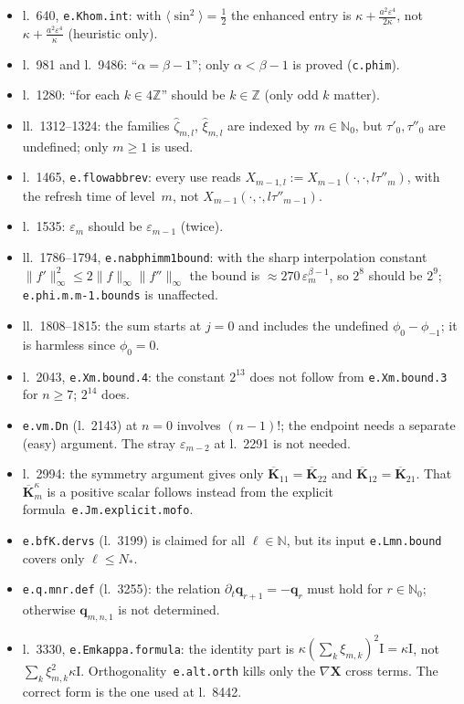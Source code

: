 \documentclass[11pt]{amsart}
\newcommand{\ep}{\varepsilon}
\newcommand{\Z}{\mathbb{Z}}
\newcommand{\N}{\mathbb{N}}
\newcommand{\Id}{\mathrm{I}}
\newcommand{\K}{\mathbf{K}}
\newcommand{\Chi}{\mathbf{X}}
\newcommand{\Ln}[1]{l.~#1}
\newcommand{\Lns}[1]{ll.~#1}
\newcommand{\lab}[1]{\texttt{#1}}
\theoremstyle{remark}
\begin{document}
\begin{itemize}
\item \Ln{640}, \lab{e.Khom.int}: with $\langle\sin^2\rangle=\frac12$ the enhanced entry is $\kappa+\frac{a^2\ep^4}{2\kappa}$, not $\kappa+\frac{a^2\ep^4}\kappa$ (heuristic only).
\item \Ln{981} and \Ln{9486}: ``$\alpha=\beta-1$''; only $\alpha<\beta-1$ is proved (\lab{c.phim}).
\item \Ln{1280}: ``for each $k\in4\Z$'' should be $k\in\Z$ (only odd $k$ matter).
\item \Lns{1312--1324}: the families $\hat\zeta_{m,l}$, $\hat\xi_{m,l}$ are indexed by $m\in\N_0$, but $\tau'_0,\tau''_0$ are undefined; only $m\geq1$ is used.
\item \Ln{1465}, \lab{e.flowabbrev}: every use reads $X_{m-1,l}:=X_{m-1}(\cdot,\cdot,l\tau''_m)$, with the refresh time of level~$m$, not $X_{m-1}(\cdot,\cdot,l\tau''_{m-1})$.
\item \Ln{1535}: $\ep_m$ should be $\ep_{m-1}$ (twice).
\item \Lns{1786--1794}, \lab{e.nabphimm1bound}: with the sharp interpolation constant $\|f'\|_\infty^2\leq2\|f\|_\infty\|f''\|_\infty$ the bound is $\approx270\,\ep_m^{\beta-1}$, so $2^8$ should be $2^9$; \lab{e.phi.m.m-1.bounds} is unaffected.
\item \Lns{1808--1815}: the sum starts at $j=0$ and includes the undefined $\phi_0-\phi_{-1}$; it is harmless since $\phi_0=0$.
\item \Ln{2043}, \lab{e.Xm.bound.4}: the constant $2^{13}$ does not follow from \lab{e.Xm.bound.3} for $n\geq7$; $2^{14}$ does.
\item \lab{e.vm.Dn} (\Ln{2143}) at $n=0$ involves $(n-1)!$; the endpoint needs a separate (easy) argument. The stray $\ep_{m-2}$ at \Ln{2291} is not needed.
\item \Ln{2994}: the symmetry argument gives only $\overline{\K}_{11}=\overline{\K}_{22}$ and $\overline{\K}_{12}=\overline{\K}_{21}$. That $\overline{\K}^\kappa_m$ is a positive scalar follows instead from the explicit formula~\lab{e.Jm.explicit.mofo}.
\item \lab{e.bfK.dervs} (\Ln{3199}) is claimed for all $\ell\in\N$, but its input \lab{e.Lmn.bound} covers only $\ell\leq N_*$.
\item \lab{e.q.mnr.def} (\Ln{3255}): the relation $\partial_t\mathbf q_{r+1}=-\mathbf q_r$ must hold for $r\in\N_0$; otherwise $\mathbf q_{m,n,1}$ is not determined.
\item \Ln{3330}, \lab{e.Emkappa.formula}: the identity part is $\kappa(\sum_k\xi_{m,k})^2\Id=\kappa\Id$, not $\sum_k\xi_{m,k}^2\kappa\Id$. Orthogonality~\lab{e.alt.orth} kills only the $\nabla\Chi$ cross terms. The correct form is the one used at \Ln{8442}.

\end{itemize}
\end{document}
